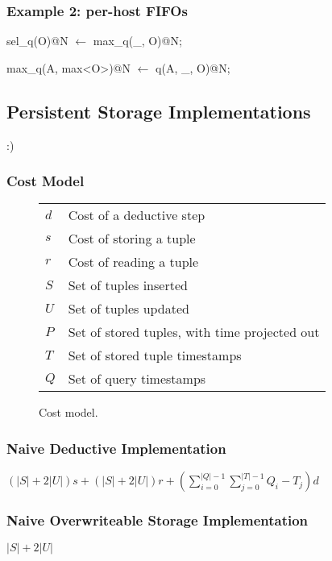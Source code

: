 \subsubsection{Example 2: per-host FIFOs}

\begin{Dedalus}
sel\_q(O)@N \(\leftarrow\)
  max\_q(_, O)@N; 

max\_q(A, max<O>)@N \(\leftarrow\)
  q(A, \_, O)@N;
\end{Dedalus}


\subsection{Persistent Storage Implementations}

:)

\subsubsection{Cost Model}

\begin{figure}[t]
\begin{tabular}{ll} \hline
$d$ & Cost of a deductive step \\
$s$ & Cost of storing a tuple \\
$r$ & Cost of reading a tuple \\ 
\hline
$S$ & Set of tuples inserted \\
$U$ & Set of tuples updated \\
$P$ & Set of stored tuples, with time projected out \\ 
$T$ & Set of stored tuple timestamps \\ 
$Q$ & Set of query timestamps \\ \hline 
\end{tabular}
\caption{Cost model.}
\label{fig:breakdown}
\end{figure}


\subsubsection{Naive Deductive Implementation}

$(|S|+2|U|)s + (|S|+2|U|)r + (\displaystyle\sum_{i=0}^{|Q|-1} \displaystyle\sum_{j=0}^{|T|-1} Q_{i} - T_{j})d$

\subsubsection{Naive Overwriteable Storage Implementation}

$|S| + 2|U|$

